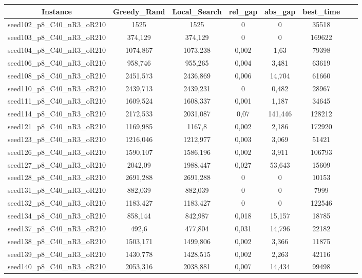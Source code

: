 \documentclass[a4paper]{article}
\begin{document}
\begin{center}
\begin{longtable}{cccccccc}
\tabularnewline
\hline
Instance & Greedy\_Rand & Local\_Search & rel\_gap & abs\_gap & best\_time\\
\hline
seed102\_p8\_C40\_nR3\_oR210 & 1525 & 1525 & 0 & 0 & 35518\\
\hline
seed103\_p8\_C40\_nR3\_oR210 & 374,129 & 374,129 & 0 & 0 & 169622\\
\hline
seed104\_p8\_C40\_nR3\_oR210 & 1074,867 & 1073,238 & 0,002 & 1,63 & 79398\\
\hline
seed106\_p8\_C40\_nR3\_oR210 & 958,746 & 955,265 & 0,004 & 3,481 & 63619\\
\hline
seed108\_p8\_C40\_nR3\_oR210 & 2451,573 & 2436,869 & 0,006 & 14,704 & 61660\\
\hline
seed110\_p8\_C40\_nR3\_oR210 & 2439,713 & 2439,231 & 0 & 0,482 & 28967\\
\hline
seed111\_p8\_C40\_nR3\_oR210 & 1609,524 & 1608,337 & 0,001 & 1,187 & 34645\\
\hline
seed114\_p8\_C40\_nR3\_oR210 & 2172,533 & 2031,087 & 0,07 & 141,446 & 128212\\
\hline
seed121\_p8\_C40\_nR3\_oR210 & 1169,985 & 1167,8 & 0,002 & 2,186 & 172920\\
\hline
seed123\_p8\_C40\_nR3\_oR210 & 1216,046 & 1212,977 & 0,003 & 3,069 & 51421\\
\hline
seed126\_p8\_C40\_nR3\_oR210 & 1590,107 & 1586,196 & 0,002 & 3,911 & 106793\\
\hline
seed127\_p8\_C40\_nR3\_oR210 & 2042,09 & 1988,447 & 0,027 & 53,643 & 15609\\
\hline
seed128\_p8\_C40\_nR3\_oR210 & 2691,288 & 2691,288 & 0 & 0 & 10153\\
\hline
seed131\_p8\_C40\_nR3\_oR210 & 882,039 & 882,039 & 0 & 0 & 7999\\
\hline
seed132\_p8\_C40\_nR3\_oR210 & 1183,427 & 1183,427 & 0 & 0 & 122546\\
\hline
seed134\_p8\_C40\_nR3\_oR210 & 858,144 & 842,987 & 0,018 & 15,157 & 18785\\
\hline
seed137\_p8\_C40\_nR3\_oR210 & 492,6 & 477,804 & 0,031 & 14,796 & 22182\\
\hline
seed138\_p8\_C40\_nR3\_oR210 & 1503,171 & 1499,806 & 0,002 & 3,366 & 11875\\
\hline
seed139\_p8\_C40\_nR3\_oR210 & 1430,778 & 1428,515 & 0,002 & 2,263 & 42116\\
\hline
seed140\_p8\_C40\_nR3\_oR210 & 2053,316 & 2038,881 & 0,007 & 14,434 & 99498\\

\end{longtable}
\end{center}
\end{document}
